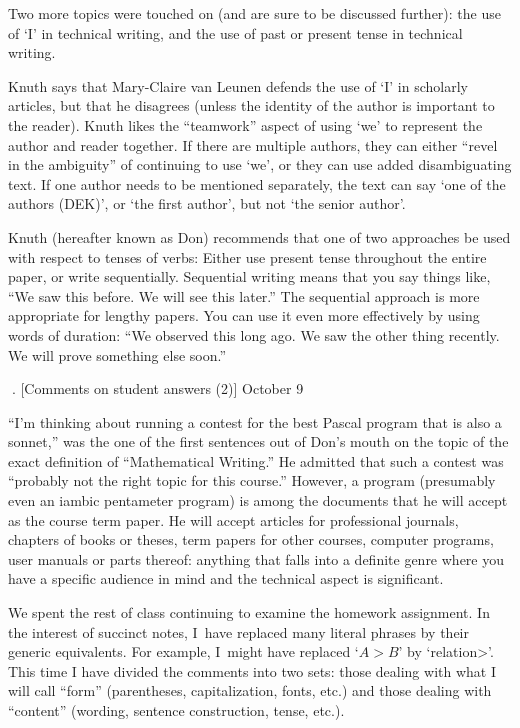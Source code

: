 Two more topics were touched on (and are sure to be discussed further):
the use of `I' in technical writing, and the use of past or present tense
in technical writing.

Knuth says that Mary-Claire van Leunen defends the use of `I' in scholarly
articles, but that he disagrees (unless the identity of the author is
important to the reader).  Knuth likes the ``teamwork'' aspect of using `we'
to represent the author and reader together.  If there are multiple authors,
they can either ``revel in the ambiguity'' of continuing
to use `we', or they can use added disambiguating text. If one author needs to
be mentioned separately, the text can
say `one of the authors (DEK)', or `the first
author', but not `the senior author'.

Knuth (hereafter known as Don)
recommends that one of two approaches be used with respect to tenses
of verbs: Either use present tense throughout the entire paper, or write
sequentially.  
Sequential writing means that you say things like,
``We saw this before.  We will see this
later.''  The sequential approach is more appropriate for lengthy
papers. You can use it even more effectively by using words of duration:
``We observed this long ago. We saw the other thing
recently. We will prove
something else soon.''

. [Comments on student answers (2)] \tll October 9

``I'm thinking about running a contest for the best Pascal program that is
also a sonnet,'' was the one of the first sentences out of Don's mouth on
the topic of the exact definition of ``Mathematical Writing.''  He admitted
that such a contest was ``probably not the right topic for this course.''
However, a program (presumably even an iambic pentameter program) is among
the documents that he will accept as the course term paper.  He will
accept articles for professional journals, chapters of books or theses,
term papers for other courses, computer programs, user manuals or parts thereof:
anything that falls into a definite genre where you have a specific
audience in mind and the technical aspect is significant.

We spent the rest of class continuing to examine the
homework assignment.  In the interest of succinct notes, I~have replaced
many literal phrases by their generic equivalents.  For example, I~might
have replaced  `$A > B$' by `\<relation>'.  This time I have divided the
comments into two sets: those dealing with what I will call ``form''
(parentheses, capitalization, fonts, etc.) and those dealing with
``content'' (wording, sentence construction, tense, etc.).

